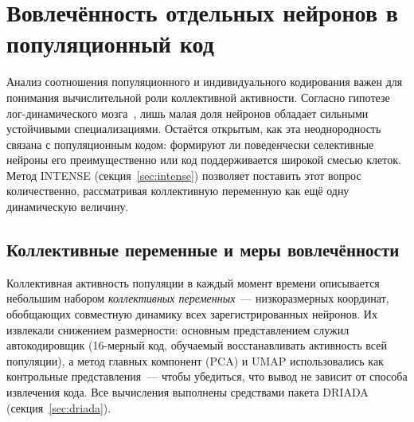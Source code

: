
\section{Вовлечённость отдельных нейронов в популяционный код}\label{sec:popcode}


Анализ соотношения популяционного и индивидуального кодирования важен для понимания вычислительной роли коллективной активности. Согласно гипотезе лог-динамического мозга~\cite{Buzsaki2014}, лишь малая доля нейронов обладает сильными устойчивыми специализациями. Остаётся открытым, как эта неоднородность связана с популяционным кодом: формируют ли поведенчески селективные нейроны его преимущественно или код поддерживается широкой смесью клеток. Метод INTENSE (секция~\ref{sec:intense}) позволяет поставить этот вопрос количественно, рассматривая коллективную переменную как ещё одну динамическую величину.

\subsection{Коллективные переменные и меры вовлечённости}\label{sec:popcode_method}

Коллективная активность популяции в каждый момент времени описывается небольшим набором \emph{коллективных переменных}~--- низкоразмерных координат, обобщающих совместную динамику всех зарегистрированных нейронов. Их извлекали снижением размерности: основным представлением служил автокодировщик (16-мерный код, обучаемый восстанавливать активность всей популяции), а метод главных компонент (PCA) и UMAP использовались как контрольные представления~--- чтобы убедиться, что вывод не зависит от способа извлечения кода. Все вычисления выполнены средствами пакета DRIADA (секция~\ref{sec:driada}).

